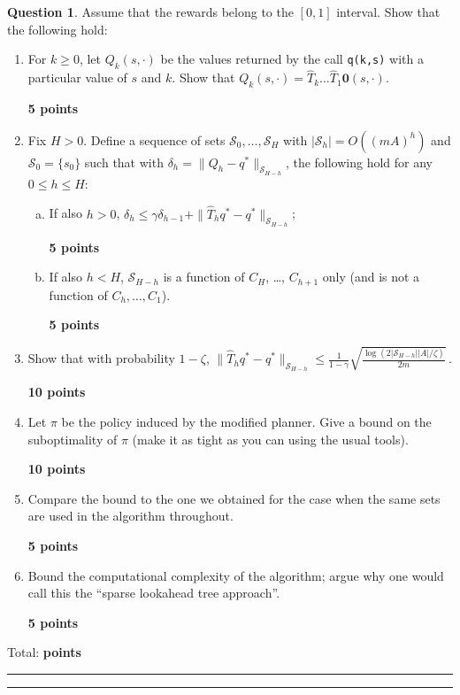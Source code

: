 \documentclass{article}
\newcommand{\norm}[1]{\| #1 \|}
\DeclareMathOperator*{\1}{\mathbbm{1}}
\newcommand{\0}{\mathbf{0}}
\newcounter{DocPoints} %
\newcounter{QuestionPoints} %
\newcommand{\points}[1]{%
	\par\mbox{}\par\noindent\hfill {\bf #1 points}%
	\addtocounter{DocPoints}{#1}
	\addtocounter{QuestionPoints}{#1}
}
\newcommand{\tpoints}[1]{        %
	\ifthenelse{\isempty{#1}}%
	{%
	}%
	{%
		\addtocounter{DocPoints}{#1}
		\addtocounter{QuestionPoints}{#1}
	}													 %
	\par\mbox{}\par\noindent\hfill {Total: \bf \arabic{QuestionPoints}\xspace points}\par\mbox{}\par\hrule\hrule
	\setcounter{QuestionPoints}{0}
}
\theoremstyle{definition}
\newtheorem{question}{Question}
\theoremstyle{remark}
\newcommand{\cS}{\mathcal{S}}
\begin{document}
\begin{question}
Assume that the rewards belong to the $[0,1]$ interval.
Show that the following hold:
\begin{enumerate}
\item For $k\ge 0$, let $Q_k(s,\cdot)$ be the values returned by the call {\tt q(k,s)} with a particular value of $s$ and $k$. Show that $Q_k(s,\cdot) = \hat T_k \dots \hat T_1 \0 (s,\cdot)$.
\points{5}
\item Fix $H>0$. Define a sequence of sets $\cS_0,\dots,\cS_H$ with $|\cS_h| = O( (mA)^h)$ and $\cS_0 = \{s_0\}$ such that with $\delta_h = \norm{Q_h - q^*}_{\cS_{H-h}}$, the following hold for any $0\le h \le H$:
\begin{enumerate}[(a)]
\item If also $h>0$, $\delta_h \le \gamma \delta_{h-1} + \norm{ \hat T_h q^* - q^* }_{\cS_{H-h}}$;
\points{5}
\item If also $h<H$, $\cS_{H-h}$ is a function of $C_H$, \dots, $C_{h+1}$ only (and is not a function of $C_{h},\dots,C_1$).
\points{5}
\end{enumerate}
\item Show that with probability $1-\zeta$, $\norm{ \hat T_h q^* - q^* }_{\cS_{H-h}}\le \frac{1}{1-\gamma} \sqrt{ \frac{\log(2|\cS_{H-h}||A|/\zeta)}{2m} }$\,.
\points{10}
\item Let $\pi$ be the policy induced by the modified planner. Give a bound on the suboptimality of $\pi$ (make it as tight as you can using the usual tools).
\points{10}
\item Compare the bound to the one we obtained for the case when the same sets are used in the algorithm throughout.
\points{5}
\item Bound the computational complexity of the algorithm; argue why one would call this the ``sparse lookahead tree approach''.
\points{5}
\end{enumerate}
\tpoints{}
\end{question}
\end{document}
